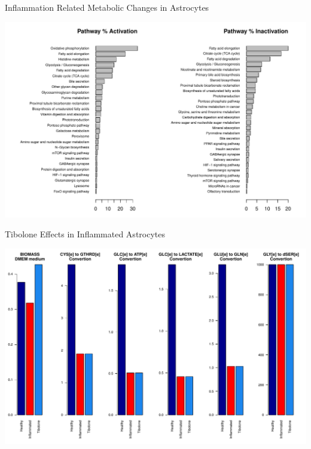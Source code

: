 \documentclass[11pt]{beamer}
\begin{document}
\begin{frame}{Inflammation Related Metabolic Changes in Astrocytes}
\begin{center}
\includegraphics[width=\textwidth]{Healthy2Inflammated}
\end{center}
\end{frame}
\begin{frame}{Tibolone Effects in Inflammated Astrocytes}
\begin{center}
\includegraphics[width=\textwidth]{Effects}
\end{center}
\end{frame}
\end{document}
